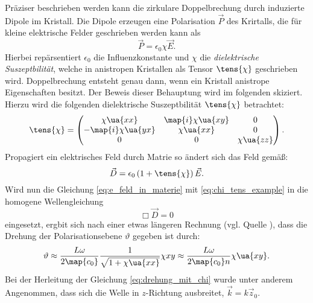 Präziser beschrieben werden kann die zirkulare Doppelbrechung durch induzierte
Dipole im Kristall. Die Dipole erzeugen eine Polarisation $\vec{P}$ des Krirtalls,
die für kleine elektrische Felder geschrieben werden kann als
\begin{equation*}
\vec{P}=\epsilon_0\chi\vec{E}.
\end{equation*}
Hierbei repärsentiert $\epsilon_0$ die Influenzkonstante und $\chi$ die
\emph{dielektrische Suszeptbilität}, welche in anistropen Kristallen als
Tensor $\tens{\chi}$ geschrieben wird. Doppelbrechung entsteht genau dann, wenn
ein Kristall anistrope Eigenschaften besitzt. Der Beweis dieser Behauptung wird
im folgenden skiziert. Hierzu wird die folgenden dielektrische Suszeptbilität
 $\tens{\chi}$ betrachtet:
\begin{equation}
  \label{eq:chi_tens_example}
  \tens{\chi}=\begin{pmatrix} \chi\ua{xx} & \map{i}\chi\ua{xy} & 0 \\ -\map{i}\chi\ua{yx} & \chi\ua{xx} & 0 \\ 0 & 0 & \chi\ua{zz} \end{pmatrix}.
\end{equation}
Propagiert ein elektrisches Feld durch Matrie so ändert sich das Feld gemäß:
\begin{equation}
  \label{eq:e_feld_in_materie}
  \vec{D}=\epsilon_0\left(1+\tens{\chi}\right)\vec{E}.
\end{equation}
Wird nun die Gleichung \eqref{eq:e_feld_in_materie} mit \eqref{eq:chi_tens_example}
in die homogene Wellengleichung
\begin{equation*}
  \Box \vec{D} = 0
\end{equation*}
eingesetzt, ergbit sich nach einer etwas längeren Rechnung (vgl. Quelle \cite{anleitungv46}),
dass die Drehung der Polarisationsebene $\vartheta$ gegeben ist durch:
\begin{equation}
  \label{eq:drehung_mit_chi}
  \vartheta \approx \frac{L\omega}{2\map{c_0}}\frac{1}{\sqrt{1+\chi\ua{xx}}}\chi{xy}\approx\frac{L\omega}{2\map{c_0}n}\chi\ua{xy}.
\end{equation}
Bei der Herleitung der Gleichung \eqref{eq:drehung_mit_chi} wurde unter anderem Angenommen,
dass sich die Welle in $z$-Richtung ausbreitet, $\vec{k}=k\vec{z}_0$.
